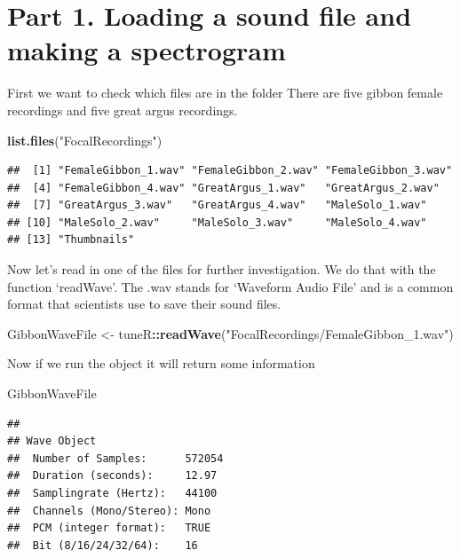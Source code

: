 \documentclass[]{book}
\newenvironment{Shaded}{\begin{snugshade}}{\end{snugshade}}
\newcommand{\KeywordTok}[1]{\textcolor[rgb]{0.13,0.29,0.53}{\textbf{#1}}}
\newcommand{\NormalTok}[1]{#1}
\newcommand{\OperatorTok}[1]{\textcolor[rgb]{0.81,0.36,0.00}{\textbf{#1}}}
\newcommand{\StringTok}[1]{\textcolor[rgb]{0.31,0.60,0.02}{#1}}
\begin{document}
\hypertarget{part-1.-loading-a-sound-file-and-making-a-spectrogram}{%
\section*{Part 1. Loading a sound file and making a spectrogram}\label{part-1.-loading-a-sound-file-and-making-a-spectrogram}}

First we want to check which files are in the folder
There are five gibbon female recordings and five great argus recordings.

\begin{Shaded}
\begin{Highlighting}[]
\KeywordTok{list.files}\NormalTok{(}\StringTok{"FocalRecordings"}\NormalTok{)}
\end{Highlighting}
\end{Shaded}

\begin{verbatim}
##  [1] "FemaleGibbon_1.wav" "FemaleGibbon_2.wav" "FemaleGibbon_3.wav"
##  [4] "FemaleGibbon_4.wav" "GreatArgus_1.wav"   "GreatArgus_2.wav"  
##  [7] "GreatArgus_3.wav"   "GreatArgus_4.wav"   "MaleSolo_1.wav"    
## [10] "MaleSolo_2.wav"     "MaleSolo_3.wav"     "MaleSolo_4.wav"    
## [13] "Thumbnails"
\end{verbatim}

Now let's read in one of the files for further investigation. We do that with the function `readWave'. The .wav stands for `Waveform Audio File' and is a common format that scientists use to save their sound files.

\begin{Shaded}
\begin{Highlighting}[]
\NormalTok{GibbonWaveFile <-}\StringTok{ }\NormalTok{tuneR}\OperatorTok{::}\KeywordTok{readWave}\NormalTok{(}\StringTok{"FocalRecordings/FemaleGibbon_1.wav"}\NormalTok{)}
\end{Highlighting}
\end{Shaded}

Now if we run the object it will return some information

\begin{Shaded}
\begin{Highlighting}[]
\NormalTok{GibbonWaveFile}
\end{Highlighting}
\end{Shaded}

\begin{verbatim}
## 
## Wave Object
##  Number of Samples:      572054
##  Duration (seconds):     12.97
##  Samplingrate (Hertz):   44100
##  Channels (Mono/Stereo): Mono
##  PCM (integer format):   TRUE
##  Bit (8/16/24/32/64):    16
\end{verbatim}
\end{document}
